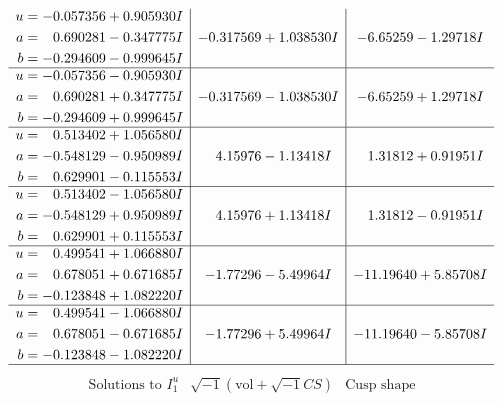\documentclass[1p]{elsarticle_modified}
\theoremstyle{definition}
\newcommand{\I}{\sqrt{-1}}
\begin{document}
$$\begin{array}{c|c|c}
\begin{aligned}
u &= -0.057356 + 0.905930 I \\
a &= \phantom{-}0.690281 - 0.347775 I \\
b &= -0.294609 - 0.999645 I\end{aligned}
 & -0.317569 + 1.038530 I & -6.65259 - 1.29718 I \\ \hline\begin{aligned}
u &= -0.057356 - 0.905930 I \\
a &= \phantom{-}0.690281 + 0.347775 I \\
b &= -0.294609 + 0.999645 I\end{aligned}
 & -0.317569 - 1.038530 I & -6.65259 + 1.29718 I \\ \hline\begin{aligned}
u &= \phantom{-}0.513402 + 1.056580 I \\
a &= -0.548129 - 0.950989 I \\
b &= \phantom{-}0.629901 - 0.115553 I\end{aligned}
 & \phantom{-}4.15976 - 1.13418 I & \phantom{-}1.31812 + 0.91951 I \\ \hline\begin{aligned}
u &= \phantom{-}0.513402 - 1.056580 I \\
a &= -0.548129 + 0.950989 I \\
b &= \phantom{-}0.629901 + 0.115553 I\end{aligned}
 & \phantom{-}4.15976 + 1.13418 I & \phantom{-}1.31812 - 0.91951 I \\ \hline\begin{aligned}
u &= \phantom{-}0.499541 + 1.066880 I \\
a &= \phantom{-}0.678051 + 0.671685 I \\
b &= -0.123848 + 1.082220 I\end{aligned}
 & -1.77296 - 5.49964 I & -11.19640 + 5.85708 I \\ \hline\begin{aligned}
u &= \phantom{-}0.499541 - 1.066880 I \\
a &= \phantom{-}0.678051 - 0.671685 I \\
b &= -0.123848 - 1.082220 I\end{aligned}
 & -1.77296 + 5.49964 I & -11.19640 - 5.85708 I\\
 \hline 
 \end{array}$$\newpage$$\begin{array}{c|c|c}  
\text{Solutions to }I^u_{1}& \I (\text{vol} + \sqrt{-1}CS) & \text{Cusp shape}\\
 \hline 
\begin{aligned}

\end{aligned}
\end{array}$$
\end{document}
